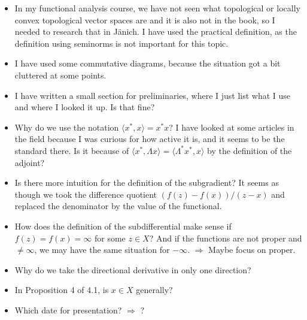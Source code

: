 \documentclass[10pt, leqno]{amsart}
\theoremstyle{definition}
\theoremstyle{remark}
\begin{document}
{\begin{center}
{\begin{minipage}{0.95\linewidth}
                \begin{itemize}[wide]
                    \item In my functional analysis course, we have not seen what topological or locally convex topological vector spaces are and it is also not in the book, so I needed to research that in Jänich. I have used the practical definition, as the definition using seminorms is not important for this topic.
                    \item I have used some commutative diagrams, because the situation got a bit cluttered at some points.
                    \item I have written a small section for preliminaries, where I just list what I use and where I looked it up. Is that fine?
                    \item Why do we use the notation \(\langle x^*, x \rangle = x^*x\)? I have looked at some articles in the field because I was curious for how active it is, and it seems to be the standard there. Is it because of \(\langle x^*, \Lambda x \rangle = \langle \Lambda^* x^*, x \rangle\) by the definition of the adjoint?
                    \item Is there more intuition for the definition of the subgradient? It seems as though we took the difference quotient \((f(z)-f(x))/(z-x)\) and replaced the denominator by the value of the functional.
                    \item How does the definition of the subdifferential make sense if \(f(z)=f(x)=\infty\) for some \(z \in X\)? And if the functions are not proper and \(\neq \infty\), we may have the same situation for \(-\infty\). \(\Rightarrow\) Maybe focus on proper.
                    \item Why do we take the directional derivative in only one direction?
                    \item In Proposition 4 of 4.1, is \(x \in X\) generally?
                    \item Which date for presentation? \(\Rightarrow\) ?
                \end{itemize}
            \end{minipage}
        }
    \end{center}
    }
\end{document}
